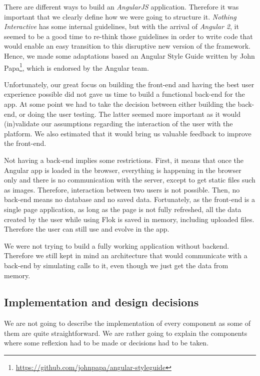 \documentclass[a4paper,12pt, oneside]{article}
\begin{document}
There are different ways to build an \emph{AngularJS} application.
Therefore it was important that we clearly define how we were going to structure it.
\emph{Nothing Interactive} has some internal guidelines, but with the arrival of \emph{Angular 2}, it seemed to be a good time to re-think those guidelines in order to write code that would enable an easy transition to this disruptive new version of the framework.
Hence, we made some adaptations based an Angular Style Guide written by John Papa\footnote{\url{https://github.com/johnpapa/angular-styleguide}}, which is endorsed by the Angular team.


Unfortunately, our great focus on building the front-end and having the best user experience possible did not gave us time to build a functional back-end for the app.
At some point we had to take the decision between either building the back-end, or doing the user testing.
The latter seemed more important as it would (in)validate our assumptions regarding the interaction of the user with the platform.
We also estimated that it would bring us valuable feedback to improve the front-end.

Not having a back-end implies some restrictions.
First, it means that once the Angular app is loaded in the browser, everything is happening in the browser only and there is no communication with the server, except to get static files such as images.
Therefore, interaction between two users is not possible.
Then, no back-end means no database and no saved data.
Fortunately, as the front-end is a single page application, as long as the page is not fully refreshed, all the data created by the user while using Flok is saved in memory, including uploaded files.
Therefore the user can still use and evolve in the app.

We were not trying to build a fully working application without backend.
Therefore we still kept in mind an architecture that would communicate with a back-end by simulating calls to it, even though we just get the data from memory.

\subsection{Implementation and design decisions}
We are not going to describe the implementation of every component as some of them are quite straightforward.
We are rather going to explain the components where some reflexion had to be made or decisions had to be taken.
\end{document}
